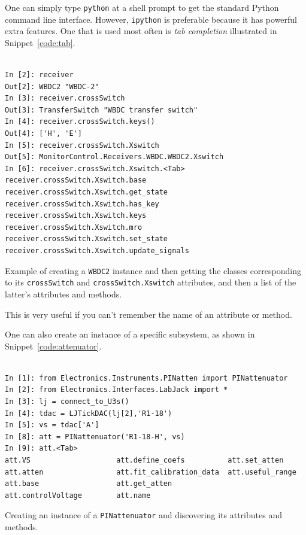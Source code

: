 \documentclass[letterpaper,11pt]{book}
\begin{document}
One can simply type {\tt python} at a shell prompt to get the standard Python
command line interface.  However, {\tt ipython} is preferable because it has
powerful extra features.  One that is used most often is {\it tab completion}
illustrated in Snippet~\ref{code:tab}.
\begin{code}[h!tb]
\begin{center}
\begin{verbatim}

In [2]: receiver
Out[2]: WBDC2 "WBDC-2"
In [3]: receiver.crossSwitch
Out[3]: TransferSwitch "WBDC transfer switch"
In [4]: receiver.crossSwitch.keys()
Out[4]: ['H', 'E']
In [5]: receiver.crossSwitch.Xswitch
Out[5]: MonitorControl.Receivers.WBDC.WBDC2.Xswitch
In [6]: receiver.crossSwitch.Xswitch.<Tab>
receiver.crossSwitch.Xswitch.base
receiver.crossSwitch.Xswitch.get_state
receiver.crossSwitch.Xswitch.has_key
receiver.crossSwitch.Xswitch.keys
receiver.crossSwitch.Xswitch.mro
receiver.crossSwitch.Xswitch.set_state
receiver.crossSwitch.Xswitch.update_signals\end{verbatim}
\caption[Creating a {\tt WBDC2} instance]{\label{code:tab}Example of creating a
{\tt WBDC2} instance and then
getting the classes corresponding to its {\tt crossSwitch} and
{\tt crossSwitch.Xswitch} attributes, and then a list of the latter's 
attributes and methods.}
\end{center}
\end{code}
This is very useful if you can't remember the name of an attribute or method.

One can also create an instance of a specific subsystem, as shown in
Snippet~\ref{code:attenuator}.
\begin{code}[h!tb]
\begin{center}
\begin{verbatim}

In [1]: from Electronics.Instruments.PINatten import PINattenuator
In [2]: from Electronics.Interfaces.LabJack import *
In [3]: lj = connect_to_U3s()
In [4]: tdac = LJTickDAC(lj[2],'R1-18')
In [5]: vs = tdac['A']
In [8]: att = PINattenuator('R1-18-H', vs)
In [9]: att.<Tab>
att.VS                    att.define_coefs          att.set_atten
att.atten                 att.fit_calibration_data  att.useful_range
att.base                  att.get_atten             
att.controlVoltage        att.name    \end{verbatim}
\caption[Creating a {\tt PINattenuator} instance]{\label{code:attenuator}
Creating an instance of a
{\tt PINattenuator} and discovering its attributes and methods.}
\end{center}
\end{code}
\end{document}

